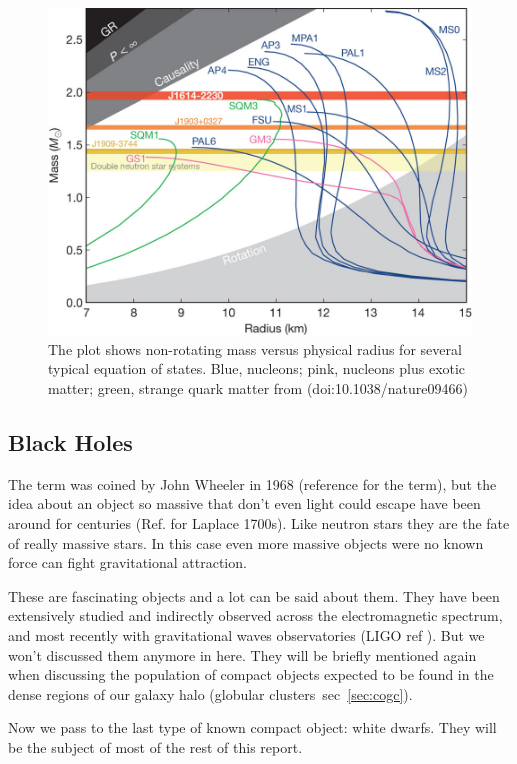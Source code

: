 \begin{figure}[]
        \centering
\includegraphics[scale=.3]{assets/images/es.jpg}
\caption{The plot shows non-rotating mass versus physical radius for several typical equation of states.  Blue, nucleons; pink, nucleons plus exotic matter; green, strange quark matter from (doi:10.1038/nature09466)}
\label{fig:nsmod}
\end{figure}


\subsection{Black Holes}\label{sec:bh}

The term was coined by John Wheeler in 1968 (reference for the term), but the idea about an object so massive that don't even light could escape have been around for centuries (Ref. for Laplace 1700s). Like neutron stars they are the fate of really massive stars. In this case even more massive objects were no known force can fight gravitational attraction. 

These are fascinating objects and a lot can be said about them. They have been extensively studied and indirectly observed across the electromagnetic spectrum, and most recently with gravitational waves observatories (LIGO ref \cite{a}). But we won't discussed them anymore in here. They will be briefly mentioned again when discussing the population of compact objects expected to be found in the dense regions of our galaxy halo (globular clusters~sec~\ref{sec:cogc}). 

Now we pass to the last type of known compact object: white dwarfs. They will be the subject of most of the rest of this report. 

